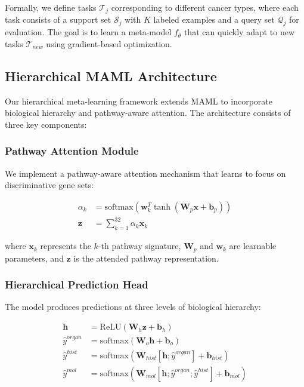\documentclass{article}
\begin{document}
Formally, we define tasks $\mathcal{T}_j$ corresponding to different cancer types, where each task consists of a support set $\mathcal{S}_j$ with $K$ labeled examples and a query set $\mathcal{Q}_j$ for evaluation. The goal is to learn a meta-model $f_\theta$ that can quickly adapt to new tasks $\mathcal{T}_{new}$ using gradient-based optimization.

\subsection{Hierarchical MAML Architecture}

Our hierarchical meta-learning framework extends MAML to incorporate biological hierarchy and pathway-aware attention. The architecture consists of three key components:

\subsubsection{Pathway Attention Module}

We implement a pathway-aware attention mechanism that learns to focus on discriminative gene sets:

\begin{align}
\alpha_k &= \text{softmax}(\mathbf{w}_k^T \tanh(\mathbf{W}_p \mathbf{x} + \mathbf{b}_p)) \\
\mathbf{z} &= \sum_{k=1}^{32} \alpha_k \mathbf{x}_k
\end{align}

where $\mathbf{x}_k$ represents the $k$-th pathway signature, $\mathbf{W}_p$ and $\mathbf{w}_k$ are learnable parameters, and $\mathbf{z}$ is the attended pathway representation.

\subsubsection{Hierarchical Prediction Head}

The model produces predictions at three levels of biological hierarchy:

\begin{align}
\mathbf{h} &= \text{ReLU}(\mathbf{W}_h \mathbf{z} + \mathbf{b}_h) \\
\hat{y}^{organ} &= \text{softmax}(\mathbf{W}_o \mathbf{h} + \mathbf{b}_o) \\
\hat{y}^{hist} &= \text{softmax}(\mathbf{W}_{hist} [\mathbf{h}; \hat{y}^{organ}] + \mathbf{b}_{hist}) \\
\hat{y}^{mol} &= \text{softmax}(\mathbf{W}_{mol} [\mathbf{h}; \hat{y}^{organ}; \hat{y}^{hist}] + \mathbf{b}_{mol})
\end{align}
\end{document}
